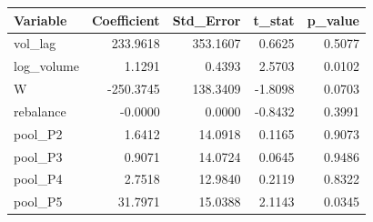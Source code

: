 \begin{tabular}{lrrrr}
\toprule
Variable & Coefficient & Std_Error & t_stat & p_value \\
\midrule
vol_lag & 233.9618 & 353.1607 & 0.6625 & 0.5077 \\
log_volume & 1.1291 & 0.4393 & 2.5703 & 0.0102 \\
W & -250.3745 & 138.3409 & -1.8098 & 0.0703 \\
rebalance & -0.0000 & 0.0000 & -0.8432 & 0.3991 \\
pool_P2 & 1.6412 & 14.0918 & 0.1165 & 0.9073 \\
pool_P3 & 0.9071 & 14.0724 & 0.0645 & 0.9486 \\
pool_P4 & 2.7518 & 12.9840 & 0.2119 & 0.8322 \\
pool_P5 & 31.7971 & 15.0388 & 2.1143 & 0.0345 \\
\bottomrule
\end{tabular}
